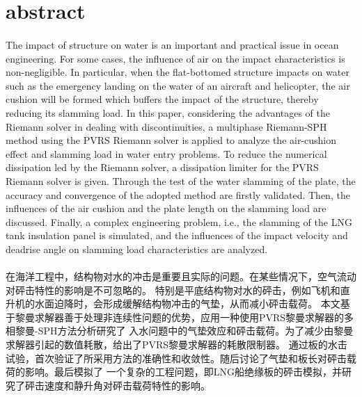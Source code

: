 \documentclass[UTF8]{ctexart}
\begin{document}
\section{abstract}
\paragraph{\quad}The impact of structure on water is an important and practical issue 
                in ocean engineering. For some cases, the influence of air on the impact 
                characteristics is non-negligible. In particular, when the flat-bottomed 
                structure impacts on water such as the emergency landing on the water of 
                an aircraft and helicopter, the air cushion will be formed which buffers 
                the impact of the structure, thereby reducing its slamming load. In this 
                paper, considering the advantages of the Riemann solver in dealing with 
                discontinuities, a multiphase Riemann-SPH method using the PVRS Riemann 
                solver is applied to analyze the air-cushion effect and slamming load in 
                water entry problems. To reduce the numerical dissipation led by the 
                Riemann solver, a dissipation limiter for the PVRS Riemann solver is given.
                Through the test of the water slamming of the plate, the accuracy and convergence 
                of the adopted method are firstly validated. Then, the influences of the air cushion 
                and the plate length on the slamming load are discussed. Finally, a complex 
                engineering problem, i.e., the slamming of the LNG tank insulation panel is 
                simulated, and the influences of the impact velocity and deadrise angle on slamming 
                load characteristics are analyzed.
\paragraph{\quad}在海洋工程中，结构物对水的冲击是重要且实际的问题。在某些情况下，空气流动对砰击特性的影响是不可忽略的。
                特别是平底结构物对水的砰击，例如飞机和直升机的水面迫降时，会形成缓解结构物冲击的气垫，从而减小砰击载荷。
                本文基于黎曼求解器善于处理非连续性问题的优势，应用一种使用PVRS黎曼求解器的多相黎曼-SPH方法分析研究了
                入水问题中的气垫效应和砰击载荷。为了减少由黎曼求解器引起的数值耗散，给出了PVRS黎曼求解器的耗散限制器。
                通过板的水击试验，首次验证了所采用方法的准确性和收敛性。随后讨论了气垫和板长对砰击载荷的影响。最后模拟了
                一个复杂的工程问题，即LNG船绝缘板的砰击模拟，并研究了砰击速度和静升角对砰击载荷特性的影响。
\end{document}
